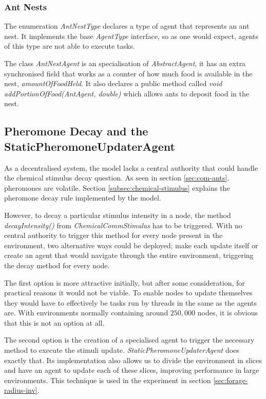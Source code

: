 \subsubsection{Ant Nests}
\label{sec:ant-nest}

The enumeration \emph{AntNestType} declares a type of agent that represents an ant nest. It implements the base \emph{AgentType} interface, so as one would expect, agents of this type are not able to execute tasks.

The class \emph{AntNestAgent} is an specialisation of \emph{AbstractAgent}, it has an extra synchronised field that works as a counter of how much food is available in the nest, \emph{amountOfFoodHeld}. It also declares a public method called \emph{void addPortionOfFood(AntAgent, double)} which allows ants to deposit food in the nest.

\subsection{Pheromone Decay and the StaticPheromoneUpdaterAgent}
\label{sec:pheromone-decay}

As a decentralised system, the model lacks a central authority that could handle the chemical stimulus decay question. As seen in section \ref{sec:com-ants}, pheromones are volatile. Section \ref{subsec:chemical-stimulus} explains the pheromone decay rule implemented by the model. 

However, to decay a particular stimulus intensity in a node, the method \emph{decayIntensity()} from \emph{ChemicalCommStimulus} has to be triggered. With no central authority to trigger this method for every node present in the environment, two alternative ways could be deployed; make each update itself or create an agent that would navigate through the entire environment, triggering the decay method for every node.

The first option is more attractive initially, but after some consideration, for practical reasons it would not be viable. To enable nodes to update themselves they would have to effectively be tasks run by threads in the same as the agents are. With environments normally containing around $250,000$ nodes, it is obvious that this is not an option at all.

The second option is the creation of a specialised agent to trigger the necessary method to execute the stimuli update. \emph{StaticPheromoneUpdaterAgent} does exactly that. Its implementation also allows us to divide the environment in slices and have an agent to update each of these slices, improving performance in large environments. This technique is used in the experiment in section \ref{sec:forage-radius-inv}.

